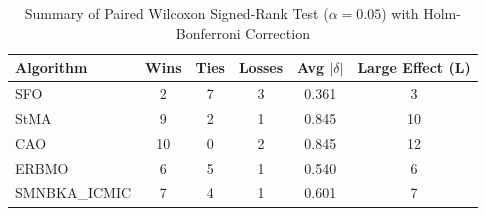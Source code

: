\begin{table}[!t]
\centering\small
\caption{Summary of Paired Wilcoxon Signed-Rank Test ($\alpha=0.05$) with Holm-Bonferroni Correction}
\label{tab:summary_stats}
\begin{tabular}{l|c|c|c|c|c}
\hline
Algorithm & Wins & Ties & Losses & Avg $|\delta|$ & Large Effect (L) \\\hline\hline
SFO & 2 & 7 & 3 & 0.361 & 3 \\\hline
StMA & 9 & 2 & 1 & 0.845 & 10 \\\hline
CAO & 10 & 0 & 2 & 0.845 & 12 \\\hline
ERBMO & 6 & 5 & 1 & 0.540 & 6 \\\hline
SMNBKA_ICMIC & 7 & 4 & 1 & 0.601 & 7 \\\hline
\end{tabular}
\end{table}
